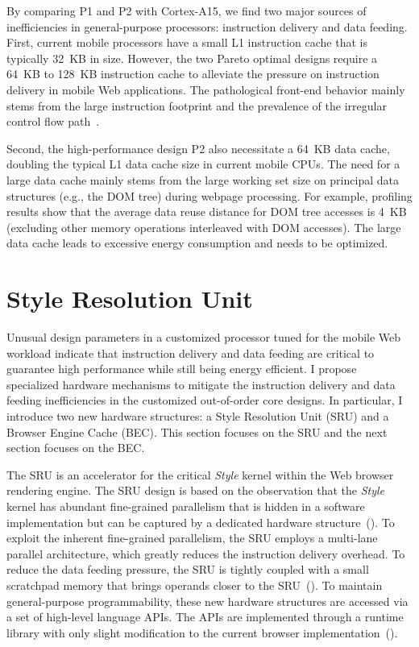 

By comparing P1 and P2 with Cortex-A15, we find two major sources of inefficiencies in general-purpose processors: instruction delivery and data feeding. First, current mobile processors have a small L1 instruction cache that is typically 32~KB in size. However, the two Pareto optimal designs require a 64~KB to 128~KB instruction cache to alleviate the pressure on instruction delivery in mobile Web applications. The pathological front-end behavior mainly stems from the large instruction footprint and the prevalence of the irregular control flow path~\cite{BBench}.

Second, the high-performance design P2 also necessitate a 64~KB data cache, doubling the typical L1 data cache size in current mobile CPUs. The need for a large data cache mainly stems from the large working set size on principal data structures (e.g., the DOM tree) during webpage processing. For example, profiling results show that the average data reuse distance for DOM tree accesses is 4~KB (excluding other memory operations interleaved with DOM accesses). The large data cache leads to excessive energy consumption and needs to be optimized.

\section{Style Resolution Unit}
\label{sec:arch:sru}

Unusual design parameters in a customized processor tuned for the mobile Web workload indicate that instruction delivery and data feeding are critical to guarantee high performance while still being energy efficient. I propose specialized hardware mechanisms to mitigate the instruction delivery and data feeding inefficiencies in the customized out-of-order core designs. In particular, I introduce two new hardware structures: a Style Resolution Unit (SRU) and a Browser Engine Cache (BEC). This section focuses on the SRU and the next section focuses on the BEC.

The SRU is an accelerator for the critical \textit{Style} kernel within the Web browser rendering engine. The SRU design is based on the observation that the \textit{Style} kernel has abundant fine-grained parallelism that is hidden in a software implementation but can be captured by a dedicated hardware structure~(). To exploit the inherent fine-grained parallelism, the SRU employs a multi-lane parallel architecture, which greatly reduces the instruction delivery overhead. To reduce the data feeding pressure, the SRU is tightly coupled with a small scratchpad memory that brings operands closer to the SRU~(). To maintain general-purpose programmability, these new hardware structures are accessed via a set of high-level language APIs. The APIs are implemented through a runtime library with only slight modification to the current browser implementation~().

